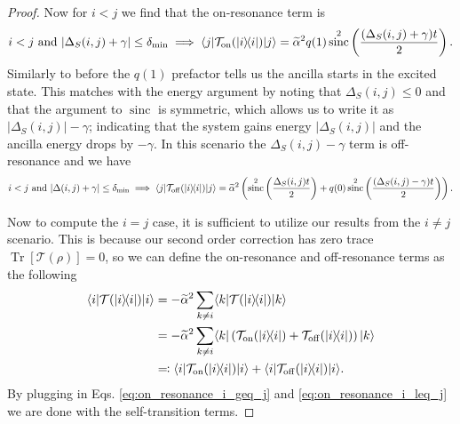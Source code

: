 \documentclass{article}
\newcommand{\on}{\rm on}
\newcommand{\off}{\rm off}
\newcommand{\ket}[1]{|#1\rangle}
\newcommand{\bra}[1]{\langle #1|}
\newcommand{\ketbra}[2]{| #1\rangle\! \langle #2|}
\newcommand{\brackets}[1]{\left[ #1 \right]}
\DeclareMathOperator{\Tr}{Tr}
\newcommand{\trace}[1]{\Tr \brackets{ #1 }}
\DeclareMathOperator{\sinc}{sinc}
\begin{document}
\begin{proof}
    Now for $i < j$ we find that the on-resonance term is 
    \begin{equation}
    i < j \text{ and } |\Delta_S(i,j) + \gamma| \le \delta_{\min} \implies \bra{j} \mathcal{T}_{\on}(\ketbra{i}{i}) \ket{j} = \widetilde{\alpha}^2 q(1) \sinc^2 \left( \frac{(\Delta_S(i,j) + \gamma)t}{2} \right). \label{eq:on_resonance_i_leq_j}
    \end{equation}
    Similarly to before the $q(1)$ prefactor tells us the ancilla starts in the excited state. This matches with the energy argument by noting that $\Delta_S(i,j) \le 0$ and that the argument to $\sinc$ is symmetric, which allows us to write it as $|\Delta_S(i,j)| - \gamma$; indicating that the system gains energy $|\Delta_S(i,j)|$ and the ancilla energy drops by $-\gamma$. In this scenario the $\Delta_S(i,j) - \gamma$ term is off-resonance and we have
    \begin{align}
        i < j \text{ and } |\Delta(i,j) + \gamma| \le \delta_{\min} \implies  \bra{j} \mathcal{T}_{\off}(\ketbra{i}{i}) \ket{j} = \widetilde{\alpha}^2\left( \sinc^2 \left( \frac{\Delta_S(i,j) t}{2} \right) + q(0) \sinc^2 \left(\frac{(\Delta_S(i,j) - \gamma) t}{2} \right) \right).
    \end{align}


    Now to compute the $i = j$ case, it is sufficient to utilize our results from the $i \neq j$ scenario. This is because our second order correction has zero trace $\trace{\mathcal{T}(\rho)} = 0$, so we can define the on-resonance and off-resonance terms as the following
    \begin{align}
        \bra{i} \mathcal{T}(\ketbra{i}{i}) \ket{i} &= - \widetilde{\alpha}^2 \sum_{k \neq i} \bra{k} \mathcal{T}(\ketbra{i}{i}) \ket{k} \\
        &= - \widetilde{\alpha}^2 \sum_{k \neq i} \bra{k} \left( \mathcal{T}_{\on}(\ketbra{i}{i}) + \mathcal{T}_{\off}(\ketbra{i}{i}) \right) \ket{k} \\
        &\eqqcolon  \bra{i} \mathcal{T}_{\on}(\ketbra{i}{i}) \ket{i} + \bra{i} \mathcal{T}_{\off}(\ketbra{i}{i}) \ket{i}.
    \end{align}
    By plugging in Eqs. \eqref{eq:on_resonance_i_geq_j} and \eqref{eq:on_resonance_i_leq_j} we are done with the self-transition terms. 
\end{proof}
\end{document}

